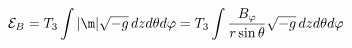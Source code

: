 \begin{equation}
{\cal E}_B=T_3\int |\m |\sqrt{-g}\,dzd\theta d\varphi =
T_3\int \frac{B_{\varphi}}{r\sin\theta}\sqrt{-g}\,dzd\theta d\varphi
\label{u1}
\end{equation}

